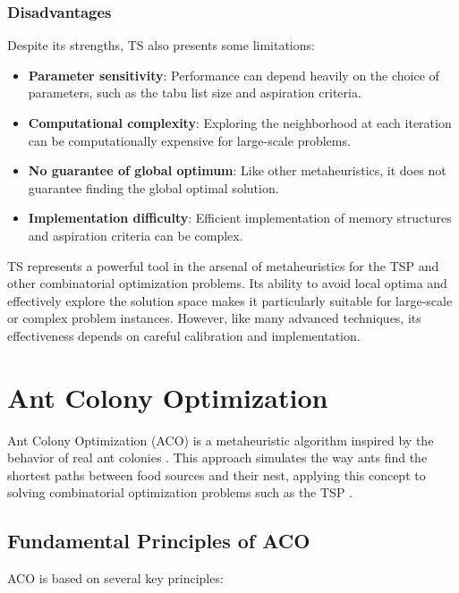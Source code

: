 \subsubsection{Disadvantages}

Despite its strengths, \Gls{TS} also presents some limitations:

\begin{itemize}
	\item \textbf{Parameter sensitivity}: Performance can depend heavily on the choice of parameters, such as the tabu list size and aspiration criteria.
	\item \textbf{Computational complexity}: Exploring the neighborhood at each iteration can be computationally expensive for large-scale problems.
	\item \textbf{No guarantee of global optimum}: Like other metaheuristics, it does not guarantee finding the global optimal solution.
	\item \textbf{Implementation difficulty}: Efficient implementation of memory structures and aspiration criteria can be complex.
\end{itemize}


\Gls{TS} represents a powerful tool in the arsenal of metaheuristics for the \Gls{TSP} and other combinatorial optimization problems. Its ability to avoid local optima and effectively explore the solution space makes it particularly suitable for large-scale or complex problem instances. However, like many advanced techniques, its effectiveness depends on careful calibration and implementation.

\section{Ant Colony Optimization}

Ant Colony Optimization (\Gls{ACO}) is a metaheuristic algorithm inspired by the behavior of real ant colonies \cite{dorigo1996ant}. This approach simulates the way ants find the shortest paths between food sources and their nest, applying this concept to solving combinatorial optimization problems such as the \Gls{TSP} \cite{dorigo1997ant}.

\subsection{Fundamental Principles of \Gls{ACO}}

\Gls{ACO} is based on several key principles:

